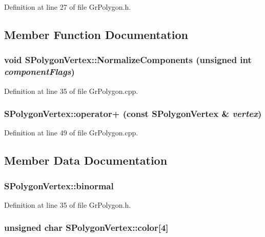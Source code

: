 Definition at line 27 of file GrPolygon.h.

\subsection{Member Function Documentation}
\hypertarget{struct_s_polygon_vertex_1789e2065c5cd01be53c443f7c8b637f}{
\subsubsection[{NormalizeComponents}]{\setlength{\rightskip}{0pt plus 5cm}void SPolygonVertex::NormalizeComponents (unsigned int {\em componentFlags})}}
\label{struct_s_polygon_vertex_1789e2065c5cd01be53c443f7c8b637f}




Definition at line 35 of file GrPolygon.cpp.\hypertarget{struct_s_polygon_vertex_22ffa5c491a96f9bd547a4f198ddf68c}{
\subsubsection[{operator+}]{ SPolygonVertex::operator+ (const {\bf SPolygonVertex} \& {\em vertex})}}
\label{struct_s_polygon_vertex_22ffa5c491a96f9bd547a4f198ddf68c}




Definition at line 49 of file GrPolygon.cpp.

\subsection{Member Data Documentation}
\hypertarget{struct_s_polygon_vertex_ac8e96e25997ee7f5460b5af7e19f5ff}{
\subsubsection[{binormal}]{ {\bf SPolygonVertex::binormal}}}
\label{struct_s_polygon_vertex_ac8e96e25997ee7f5460b5af7e19f5ff}




Definition at line 35 of file GrPolygon.h.\hypertarget{struct_s_polygon_vertex_78c196bc8cb7d1b64630d59d4df5acb5}{
\subsubsection[{color}]{\setlength{\rightskip}{0pt plus 5cm}unsigned char {\bf SPolygonVertex::color}\mbox{[}4\mbox{]}}}
\label{struct_s_polygon_vertex_78c196bc8cb7d1b64630d59d4df5acb5}




